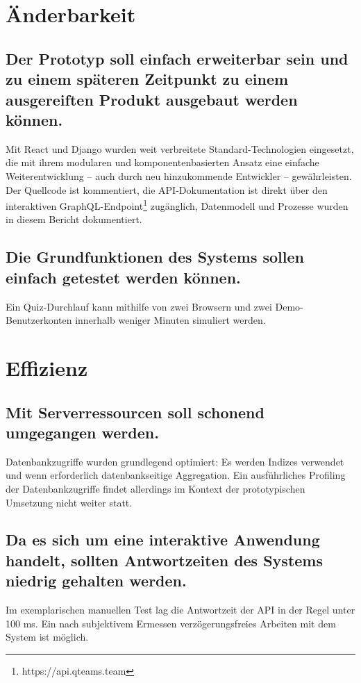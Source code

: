 \documentclass[a4paper,11pt,listof=numbered,glossary=totoc,parskip=half,toc=bib]{scrreprt}
\begin{document}
\begin{appendices}
	
	\section{Änderbarkeit}
	
	\subsection{Der Prototyp soll einfach erweiterbar sein und zu einem späteren Zeitpunkt zu einem ausgereiften Produkt ausgebaut werden können.}
	Mit React und Django wurden weit verbreitete Standard-Technologien eingesetzt, die mit ihrem modularen und komponentenbasierten Ansatz eine einfache Weiterentwicklung -- auch durch neu hinzukommende Entwickler -- gewährleisten. Der Quellcode ist kommentiert, die API-Dokumentation ist direkt über den interaktiven GraphQL-Endpoint\footnote{https://api.qteams.team} zugänglich, Datenmodell und Prozesse wurden in diesem Bericht dokumentiert.
	
		\subsection{Die Grundfunktionen des Systems sollen einfach getestet werden können.}
		Ein Quiz-Durchlauf kann mithilfe von zwei Browsern und zwei Demo-Benutzerkonten innerhalb weniger Minuten simuliert werden.
		
	
	\section{Effizienz}
		\subsection{Mit Serverressourcen soll schonend umgegangen werden.}
		Datenbankzugriffe wurden grundlegend optimiert: Es werden Indizes verwendet und wenn erforderlich datenbankseitige Aggregation. Ein ausführliches Profiling der Datenbankzugriffe findet allerdings im Kontext der prototypischen Umsetzung nicht weiter statt.		
		
		\subsection{Da es sich um eine interaktive Anwendung handelt, sollten Antwortzeiten des Systems niedrig gehalten werden.}
		Im exemplarischen manuellen Test lag die Antwortzeit der API in der Regel unter 100 ms. Ein nach subjektivem Ermessen verzögerungsfreies Arbeiten mit dem System ist möglich. 
	

\end{appendices}
\end{document}
